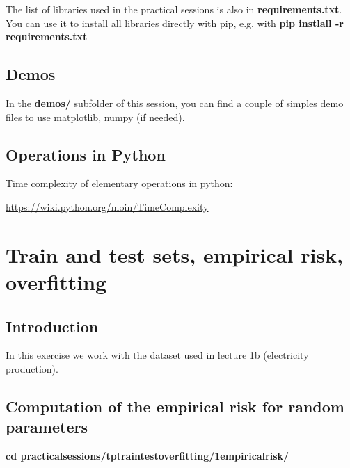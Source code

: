 \documentclass[
10pt, %
a4paper, %
oneside, %
headinclude,footinclude, %
BCOR5mm, %
]{scrartcl}
\begin{document}
The list of libraries used in the practical sessions is also in \textbf{requirements.txt}. You can use it to install all libraries directly with pip, e.g. with \textbf{pip instlall -r requirements.txt} 

\subsection*{Demos}

In the \textbf{demos/} subfolder of this session, you can find a couple of simples demo files to use matplotlib, numpy (if needed).

\subsection*{Operations in Python}

Time complexity of elementary operations in python:

\url{https://wiki.python.org/moin/TimeComplexity} 
 

\pagebreak

\section{\large\color{Blue}Train and test sets, empirical risk, overfitting}

\subsection{Introduction}

In this exercise we work with the dataset used in lecture 1b (electricity production).

\subsection{Computation of the empirical risk for random parameters}

    \textbf{cd practical\textunderscore sessions/tp\textunderscore train\textunderscore test\textunderscore overfitting/1\textunderscore empirical\textunderscore risk/}
\end{document}
